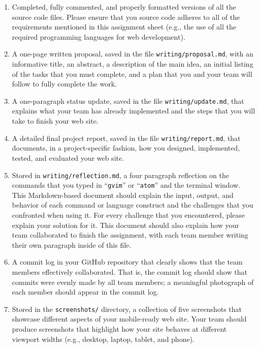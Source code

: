 \documentclass[11pt]{article}
\newcommand{\reflection}{\lstinline{writing/reflection.md}}
\newcommand{\command}[1]{``\lstinline{#1}''}
\newcommand{\program}[1]{\lstinline{#1}}
\begin{document}
\begin{enumerate}

  \setlength{\itemsep}{0in}

\item Completed, fully commented, and properly formatted versions of all the
  source code files. Please ensure that you source code adheres to all of the
  requirements mentioned in this assignment sheet (e.g., the use of all the
  required programming languages for web development).

\item A one-page written proposal, saved in the file
  \program{writing/proposal.md}, with an informative title, an abstract, a
  description of the main idea, an initial listing of the tasks that you must
  complete, and a plan that you and your team will follow to fully complete the
  work.

\item A one-paragraph status update, saved in the file
  \program{writing/update.md}, that explains what your team has already
  implemented and the steps that you will take to finish your web site.

\item A detailed final project report, saved in the file
  \program{writing/report.md}, that documents, in a project-specific fashion,
  how you designed, implemented, tested, and evaluated your web site.

\item Stored in \reflection{}, a four paragraph reflection on the commands that
  you typed in \command{gvim} or \command{atom} and the terminal window. This
  Markdown-based document should explain the input, output, and behavior of each
  command or language construct and the challenges that you confronted when
  using it. For every challenge that you encountered, please explain your
  solution for it. This document should also explain how your team collaborated
  to finish the assignment, with each team member writing their own paragraph
  inside of this file.

\item A commit log in your GitHub repository that clearly shows that the team
  members effectively collaborated. That is, the commit log should show that
  commits were evenly made by all team members; a meaningful photograph of each
  member should appear in the commit log.

\item Stored in the \program{screenshots/} directory, a collection of five
  screenshots that showcase different aspects of your mobile-ready web site.
  Your team should produce screenshots that highlight how your site behaves at
  different viewport widths (e.g., desktop, laptop, tablet, and phone).


\end{enumerate}
\end{document}
